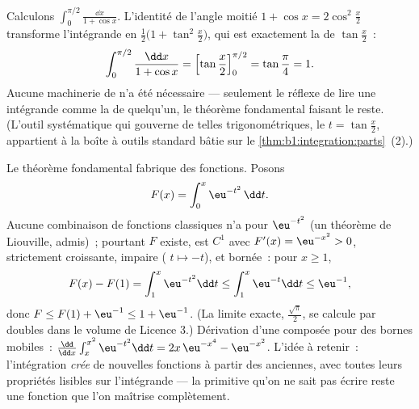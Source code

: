 \begin{example}\label{ex:b1:integration:halfangle}
Calculons $\displaystyle\int_0^{\pi/2} \frac{\dd x}{1 + \cos x}$.
L'identité de l'angle moitié $1 + \cos x = 2\cos^2\frac x2$
transforme l'intégrande en $\frac{1}{2}\bigl(1 + \tan^2\frac
x2\bigr)$, qui est exactement la  de $\tan\frac x2$~:
\[
\int_0^{\pi/2} \frac{\dd x}{1 + \cos x}
= \Bigl[\tan\frac x2\Bigr]_0^{\pi/2} = \tan\frac\pi4 = 1 .
\]
Aucune machinerie de  n'a été nécessaire ---
seulement le réflexe de lire une intégrande comme la  de
quelqu'un, le théorème fondamental faisant le reste. (L'outil
systématique qui gouverne de telles  trigonométriques,
le  $t = \tan\frac x2$, appartient à la
boîte à outils standard bâtie sur
le \cref{thm:b1:integration:parts}~(2).)
\end{example}

\begin{example}\label{ex:b1:integration:definedby}
Le théorème fondamental fabrique des fonctions. Posons
\[
F(x) = \int_0^x \eu^{-t^2}\,\dd t .
\]
Aucune combinaison de fonctions classiques n'a pour 
$\eu^{-t^2}$ (un théorème de Liouville, admis)~; pourtant $F$
existe, est $C^1$ avec $F'(x) = \eu^{-x^2} > 0$, strictement
croissante, impaire ( $t \mapsto -t$), et
bornée~: pour $x \geq 1$,
\[
F(x) - F(1) = \int_1^x \eu^{-t^2}\dd t
\leq \int_1^x \eu^{-t}\dd t \leq \eu^{-1} ,
\]
donc $F \leq F(1) + \eu^{-1} \leq 1 + \eu^{-1}$. (La limite exacte,
$\frac{\sqrt\pi}{2}$, se calcule par  doubles dans le
volume de Licence 3.) Dérivation d'une composée pour des bornes
mobiles~: $\frac{\dd}{\dd x}\int_x^{x^2} \eu^{-t^2}\dd t =
2x\,\eu^{-x^4} - \eu^{-x^2}$. L'idée à retenir~: l'intégration
\emph{crée} de nouvelles fonctions à partir des anciennes, avec
toutes leurs propriétés lisibles sur l'intégrande --- la primitive
qu'on ne sait pas écrire reste une fonction que l'on maîtrise
complètement.
\end{example}

